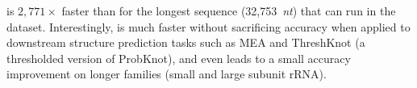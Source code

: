 \linearpartition is $2,771\times$ faster than \contrafold for the longest sequence (32,753~{\it nt})
that \contrafold can run 
in the dataset.
Interestingly, \linearpartition is much faster without sacrificing accuracy when applied to downstream structure prediction tasks such as MEA and ThreshKnot (a thresholded version of ProbKnot), and even leads to a small accuracy improvement on longer families (small and large subunit rRNA).




